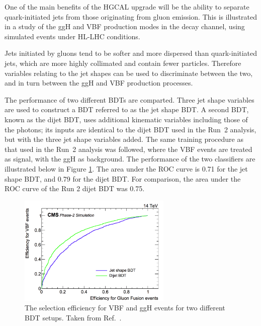 One of the main benefits of the HGCAL upgrade will be the ability to separate quark-initiated jets from those originating from gluon emission.
This is illustrated in a study of the ggH and VBF production modes in the \Hgg decay channel, using simulated events under HL-LHC conditions.

Jets initiated by gluons tend to be softer and more dispersed than quark-initiated jets, which are more highly collimated and contain fewer particles. 
Therefore variables relating to the jet shapes can be used to discriminate between the two, and in turn between the ggH and VBF production processes.

The performance of two different BDTs are comparted. 
Three jet shape variables are used to construct a BDT referred to as the jet shape BDT.
A second BDT, known as the dijet BDT, uses additional kinematic variables including those of the photons; 
its inputs are identical to the dijet BDT used in the Run~2 analysis, but with the three jet shape variables added.
The same training procedure as that used in the Run~2 analysis was followed, 
where the VBF events are treated as signal, with the ggH as background.
The performance of the two classifiers are illustrated below in Figure \ref{fig:hgcal_VBFvsGGH}.
The area under the ROC curve is 0.71 for the jet shape BDT, and 0.79 for the dijet BDT.
For comparison, the area under the ROC curve of the Run 2 dijet BDT was 0.75.

\begin{figure}[h!]
  \centering
  \includegraphics[width=0.65\textwidth]{Figures/HGCAL/VBFvsGGH.png}
  \caption{The selection efficiency for VBF and ggH events for two different BDT setups. Taken from Ref.~\cite{HGCAL}.}
  \label{fig:hgcal_VBFvsGGH}
\end{figure}

